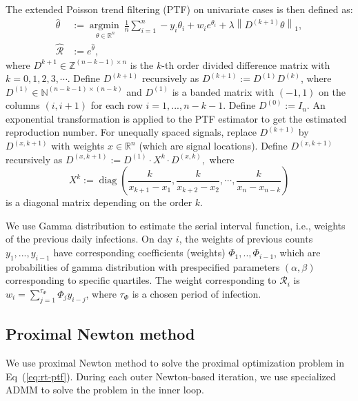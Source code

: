 \documentclass[10pt,letterpaper]{article}
\def\calR{\mathcal{R}}
\def\bbN{\mathbb{N}}
\def\bbR{\mathbb{R}}
\def\bbZ{\mathbb{Z}}
\DeclareMathOperator*{\diag}{diag}
\DeclareMathOperator*{\argmin}{argmin}
\newcommand{\Argmin}[1]{\underset{#1}{\argmin\ }}
\def\sumN{\sum_{i=1}^n}
\newcommand{\fr}[1]{\frac{1}{#1}}
\newcommand{\lr}[1]{\left(#1\right)}
\newcommand{\norm}[1]{\left\lVert #1 \right\rVert}
\renewcommand{\eqref}[1]{Eq~(\ref{#1})}
\begin{document}
The extended Poisson trend filtering (PTF) on univariate cases is then defined as:
\begin{equation} \label{eq:rt-ptf}
    \begin{split}
        \hat{\theta} &:= \Argmin{\theta\in\bbR^n} \fr{n}\sumN -y_i \theta_i + w_i e^{\theta_i} + \lambda \norm{D^{(k+1)} \theta}_1, \\
        \hat{\calR} &:= e^{\hat{\theta}},
    \end{split}
\end{equation}
where $D^{k+1} \in \bbZ^{(n-k-1)\times n}$ is the $k$-th order divided difference matrix with $k=0,1,2,3,\cdots$. Define $D^{(k+1)}$ recursively as $D^{(k+1)} := D^{(1)} D^{(k)}$, where $D^{(1)}\in\bbN^{(n-k-1)\times (n-k)}$ and $D^{(1)}$ is a banded matrix with $(-1,1)$ on the columns $(i,i+1)$ for each row $i=1,...,n-k-1$. Define $D^{(0)} := I_n$. An exponential transformation is applied to the PTF estimator to get the estimated reproduction number.
%
For unequally spaced signals, replace $D^{(k+1)}$ by $D^{(x,k+1)}$ with weights $x\in \mathbb{R}^n$ (which are signal locations). Define $D^{(x,k+1)}$ recursively as $D^{(x,k+1)} := D^{(1)}\cdot X^k \cdot D^{(x,k)}, $
where $$X^k := \diag \lr{\frac{k}{x_{k+1} - x_1}, \frac{k}{x_{k+2} - x_2}, \cdots, \frac{k}{x_n - x_{n-k}} }$$ is a diagonal matrix depending on the order $k$.

We use Gamma distribution to estimate the serial interval function, i.e., weights of the previous daily infections. On day $i$, the weights of previous counts $y_1,...,y_{i-1}$ have corresponding coefficients (weights) $\Phi_1,..,\Phi_{i-1}$, which are probabilities of gamma distribution with prespecified parameters $(\alpha,\beta)$ corresponding to specific quartiles. The weight corresponding to $\calR_i$ is $w_i = \sum_{j=1}^{\tau_{\Phi}} \Phi_j y_{i-j}$, where $\tau_{\Phi}$ is a chosen period of infection.


\subsection*{Proximal Newton method} %

We use proximal Newton method to solve the proximal optimization problem in \eqref{eq:rt-ptf}. During each outer Newton-based iteration, we use specialized ADMM \cite{ramdas2016fast} to solve the problem in the inner loop. %
\end{document}
